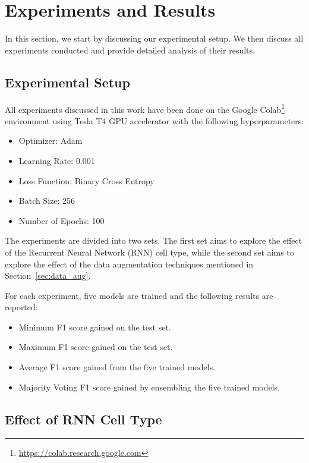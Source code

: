 \documentclass[11pt,a4paper]{article}
\begin{document}
\section{Experiments and Results}
\label{sec:result}

In this section, we start by discussing our experimental setup. We then discuss all experiments conducted and provide detailed analysis of their results.

\subsection{Experimental Setup}

All experiments discussed in this work have been done on the Google Colab\footnote{\url{https://colab.research.google.com}} \cite{carneiro2018performance} environment using Tesla T4 GPU accelerator with the following hyperparameters:
\begin{itemize}
  \item Optimizer: Adam
  \item Learning Rate: 0.001
  \item Loss Function: Binary Cross Entropy
  \item Batch Size: 256
  \item Number of Epochs: 100
\end{itemize}

The experiments are divided into two sets. The first set aims to explore the effect of the Recurrent Neural Network (RNN) cell type, while the second set aims to explore the effect of the data augmentation techniques mentioned in Section~\ref{sec:data_aug}.

For each experiment, five models are trained and the following results are reported:
\begin{itemize}
  \item Minimum F1 score gained on the test set.
  \item Maximum F1 score gained on the test set.
  \item Average F1 score gained from the five trained models.
  \item Majority Voting F1 score gained by ensembling the five trained models.
\end{itemize}

\subsection{Effect of RNN Cell Type}
\label{sec:package_1}
\end{document}
